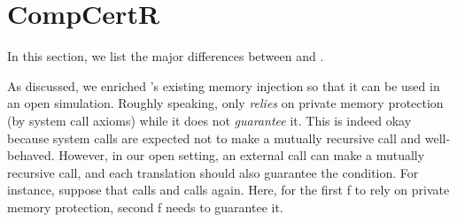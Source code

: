 \section{CompCertR}
\label{sec:compiler:compcertr}

In this section, we list the major differences between \cc{} and \ccr{}.

As discussed, we enriched \cc{}'s existing memory injection so that it can be used in an open simulation.
Roughly speaking, \cc{} only \emph{relies} on private memory protection (by system call axioms) while it does not \emph{guarantee} it.
This is indeed okay because system calls are expected not to make a mutually recursive call and well-behaved.
However, in our open setting, an external call can make a mutually recursive call, and each translation should also guarantee the condition.
For instance, suppose that  calls  and  calls  again.
Here, for the first f to rely on private memory protection, second f needs to guarantee it.

